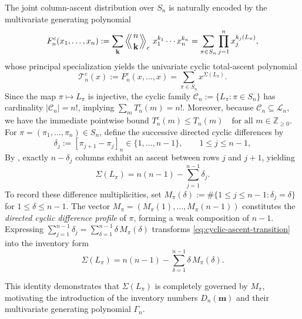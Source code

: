 \documentclass[11pt,a4paper]{amsart}
\newcommand{\T}{\mathcal{T}}
\newcommand{\1}{\mathbf{1}}
\newcommand{\LE}[1]{\left\langle\!\!\left\langle #1 \right\rangle\!\!\right\rangle}
\begin{document}
The joint column-ascent distribution over $S_n$ is naturally encoded by the multivariate generating polynomial
\[
F_n^c(x_1, \dots, x_n) := \sum_{\mathbf{k}} \LE{n \atop \mathbf{k}}_c \, x_1^{k_1} \cdots x_n^{k_n} = \sum_{\pi \in S_n} \prod_{j=1}^n x_j^{k_j(L_\pi)},
\]
whose principal specialization yields the univariate cyclic total-ascent polynomial 
\[
\T_n^{c}(x) := F_n^c(x, \dots, x) = \sum_{\pi \in S_n} x^{\Sigma(L_\pi)}.
\]
Since the map $\pi \longmapsto L_\pi$ is injective, the cyclic family $\mathcal{C}_n := \{L_\pi : \pi \in S_n\}$ has cardinality $|\mathcal{C}_n| = n!$, implying $\sum_m T_n^c(m) = n!$. Moreover, because $\mathcal{C}_n \subseteq \mathcal{L}_n$, we have the immediate pointwise bound $T_n^c(m) \le T_n(m) \quad \text{for all } m \in \mathbb{Z}_{\ge 0}.$
For $\pi = (\pi_1, \dots, \pi_n) \in S_n$, define the successive directed cyclic differences by
\[
\delta_j := [\pi_{j+1} - \pi_j]_n \in \{1, \dots, n-1\}, \qquad 1 \le j \le n-1,
\]
 By \cite[Prop.~4.5]{LEN}, exactly $n - \delta_j$ columns exhibit an ascent between rows $j$ and $j+1$, yielding
\begin{equation}
\label{eq:cyclic-ascent-transition}
\Sigma(L_\pi) = n(n-1) - \sum_{j=1}^{n-1} \delta_j.
\end{equation}
To record these difference multiplicities, set $M_\pi(\delta) := \#\{1 \le j \le n-1 : \delta_j = \delta\}$ for $1 \le \delta \le n-1$. The vector $M_\pi = (M_\pi(1), \dots, M_\pi(n-1))$ constitutes the \emph{directed cyclic difference profile} of $\pi$, forming a weak composition of $n-1$. Expressing $\sum_{j=1}^{n-1} \delta_j = \sum_{\delta=1}^{n-1} \delta \, M_\pi(\delta)$ transforms \eqref{eq:cyclic-ascent-transition} into the inventory form
\begin{equation}
\label{eq:cyclic-ascent-inventory}
\Sigma(L_\pi) = n(n-1) - \sum_{\delta=1}^{n-1} \delta \, M_\pi(\delta).
\end{equation}

 This identity demonstrates that $\Sigma(L_\pi)$ is completely governed by $M_\pi$, motivating the introduction of the inventory numbers $D_n(\mathbf{m})$ and their multivariate generating polynomial $\Gamma_n$. 
\end{document}
